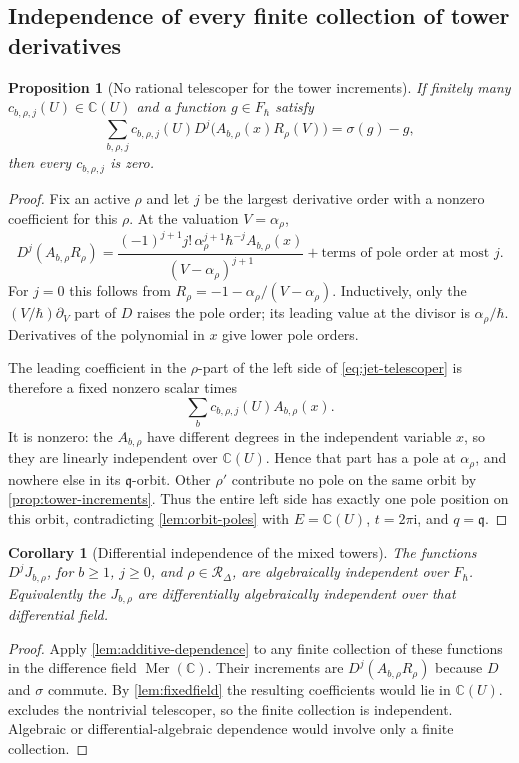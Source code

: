 \documentclass[11pt]{article}
\numberwithin{equation}{section}
\newtheorem{proposition}[proposition]{Proposition}
\newtheorem{corollary}[corollary]{Corollary}
\theoremstyle{definition}
\theoremstyle{remark}
\newcommand{\C}{\mathbb C}
\newcommand{\ii}{\mathrm i}
\newcommand{\Mer}{\operatorname{Mer}}
\newcommand{\qh}{\hbar}
\begin{document}
\subsection{Independence of every finite collection of tower derivatives}

\begin{proposition}[No rational telescoper for the tower increments]
\label{prop:no-telescope}
If finitely many $c_{b,\rho,j}(U)\in\C(U)$ and a function $g\in F_\qh$
satisfy
\begin{equation}\label{eq:jet-telescoper}
 \sum_{b,\rho,j}c_{b,\rho,j}(U)
 D^j\bigl(A_{b,\rho}(x)R_\rho(V)\bigr)=\sigma(g)-g,
\end{equation}
then every $c_{b,\rho,j}$ is zero.
\end{proposition}
\begin{proof}
Fix an active $\rho$ and let $j$ be the largest derivative order with a
nonzero coefficient for this $\rho$. At the valuation $V=\alpha_\rho$,
\begin{equation}\label{eq:leading-jet-pole}
 D^j(A_{b,\rho}R_\rho)
 =\frac{(-1)^{j+1}j!\,\alpha_\rho^{j+1}\qh^{-j}A_{b,\rho}(x)}
 {(V-\alpha_\rho)^{j+1}}
 +\text{terms of pole order at most }j.
\end{equation}
For $j=0$ this follows from
$R_\rho=-1-\alpha_\rho/(V-\alpha_\rho)$. Inductively, only the
$(V/\qh)\partial_V$ part of $D$ raises the pole order; its leading value at
the divisor is $\alpha_\rho/\qh$. Derivatives of the polynomial in $x$ give
lower pole orders.

The leading coefficient in the $\rho$-part of the left side of
\eqref{eq:jet-telescoper} is therefore a fixed nonzero scalar times
\[
 \sum_b c_{b,\rho,j}(U)A_{b,\rho}(x).
\]
It is nonzero: the $A_{b,\rho}$ have different degrees in the independent
variable $x$, so they are linearly independent over $\C(U)$.
Hence that part has a pole at $\alpha_\rho$, and nowhere else in its
$\mathfrak q$-orbit. Other $\rho'$ contribute no pole on the same orbit by
\cref{prop:tower-increments}. Thus the entire left side has exactly one pole
position on this orbit, contradicting \cref{lem:orbit-poles} with
$E=\C(U)$, $t=2\pi\ii$, and $q=\mathfrak q$.
\end{proof}

\begin{corollary}[Differential independence of the mixed towers]
\label{cor:tower-independent}
The functions $D^jJ_{b,\rho}$, for $b\geq1$, $j\geq0$, and
$\rho\in\mathscr R_\Delta$, are algebraically independent over $F_\qh$.
Equivalently the $J_{b,\rho}$ are differentially algebraically independent
over that differential field.
\end{corollary}
\begin{proof}
Apply \cref{lem:additive-dependence} to any finite collection of these
functions in the difference field $\Mer(\C)$. Their increments are
$D^j(A_{b,\rho}R_\rho)$ because $D$ and $\sigma$ commute. By
\cref{lem:fixedfield} the resulting coefficients would lie in $\C(U)$.
 excludes the nontrivial telescoper, so the finite
collection is independent. Algebraic or differential-algebraic dependence
would involve only a finite collection.
\end{proof}
\end{document}
